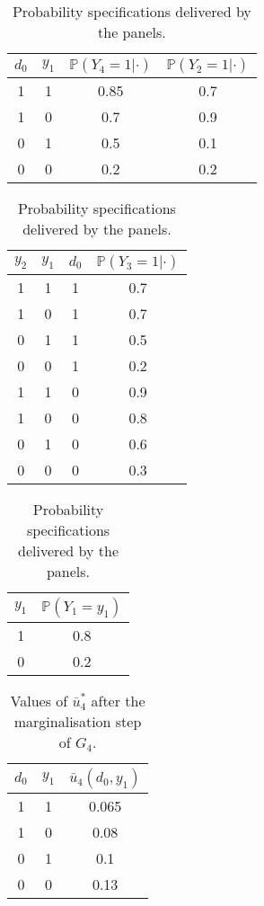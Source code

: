 \begin{table}
\begin{center}
\begin{tabular}{|c|c|c|c|}
\hline
$d_0$&$y_1$&$\mathbb{P}(Y_4=1|\cdot)$&$\mathbb{P}(Y_2=1|\cdot)$\\
\hline\hline
1&1&0.85&0.7\\
1&0&0.7&0.9\\
0&1&0.5&0.1\\
0&0&0.2&0.2\\
\hline
\end{tabular}
\hspace{0.15cm}
\begin{tabular}{|c|c|c|c|}
\hline
$y_2$&$y_1$&$d_0$&$\mathbb{P}(Y_3=1|\cdot)$\\
\hline\hline
1&1&1&0.7\\
1&0&1&0.7\\
0&1&1&0.5\\
0&0&1&0.2\\
1&1&0&0.9\\
1&0&0&0.8\\
0&1&0&0.6\\
0&0&0&0.3\\
\hline
\end{tabular}
\hspace{0.15cm}
\begin{tabular}{|c|c|}
\hline 
$y_1$&$\mathbb{P}(Y_1=y_1)$\\
\hline
1&0.8\\
\hline
0&0.2 \\
\hline
\end{tabular}
\end{center}
\caption{Probability specifications delivered by the panels. \label{table:ex3}}
\end{table}

\begin{table}
\begin{center}
\begin{tabular}{|c|c|c|}
\hline
$d_0$&$y_1$&$\bar{u}_4(d_0,y_1)$\\
\hline\hline
1&1&0.065\\
1&0&0.08\\
0&1&0.1\\
0&0&0.13\\
\hline
\end{tabular}
\caption{Values of $\bar{u}^*_4$ after the marginalisation step of $G_4$. \label{table:ex4}}
\end{center}
\end{table}

